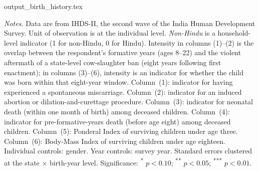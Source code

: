 \documentclass[11pt,twoside]{extarticle}
\begin{document}
\begin{table}[!htbp]
\centering
\caption{\bf Birth History and Early-Life Growth Deficiency of Muslim Households Exposed to Cow-Slaughter Bans}
\label{Table:birth_history}\label{tab:birth_history}
\begin{threeparttable}
    \onehalfspacing
    {output_birth_history.tex}
    \begin{tablenotes}
        \footnotesize
        \textit{Notes.}
        Data are from IHDS-II, the second wave of the India Human Development
        Survey. Unit of observation is at the individual level.
        \textit{Non-Hindu} is a household-level indicator (1 for non-Hindu, 0 for Hindu).
        Intensity in columns (1)--(2) is the overlap between the respondent's
        formative years (ages 8--22) and the violent aftermath of a state-level
        cow-slaughter ban (eight years following first enactment); in columns
        (3)--(6), intensity is an indicator for whether the child was born
        within that eight-year window. Column~(1): indicator for having
        experienced a spontaneous miscarriage. Column~(2): indicator for an
        induced abortion or dilation-and-curettage procedure. Column~(3):
        indicator for neonatal death (within one month of birth) among
        deceased children. Column~(4): indicator for pre-formative-years
        death (before age eight) among deceased children. Column~(5):
        Ponderal Index of surviving children under age three. Column~(6):
        Body-Mass Index of surviving children under age eighteen. Individual
        controls: gender. Year controls: survey year. Standard errors
        clustered at the state $\times$ birth-year level. Significance:
        \textsuperscript{*} $p < 0.10$;
        \textsuperscript{**} $p < 0.05$;
        \textsuperscript{***} $p < 0.01$.
    \end{tablenotes}
\end{threeparttable}
\end{table}
\end{document}
